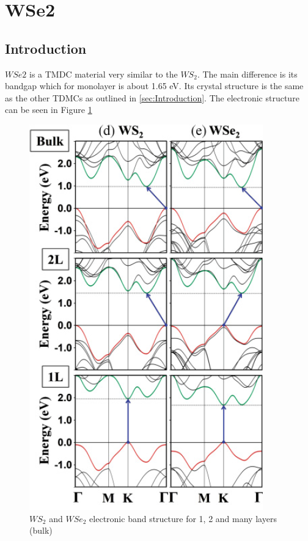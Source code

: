 \section{WSe2}

	\subsection{Introduction}
	
		$WSe2$ is a TMDC material very similar to the $WS_2$. The main difference is its bandgap which for monolayer is about 1.65 eV. Its crystal structure is the same as the other TDMCs as outlined in \ref{sec:Introduction}. The electronic structure can be seen in Figure \ref{fig:WSe2BandStructureWSe2WS2}
		
\begin{figure}
	\begin{center}
		\includegraphics[scale=0.5]{WSe2/WSe2BandStructureWSe2WS2.png}
		\caption{$WS_2$ and $WSe_2$ electronic band structure for 1, 2 and many layers (bulk)}
		\label{fig:WSe2BandStructureWSe2WS2}
	\end{center}
\end{figure}
	
